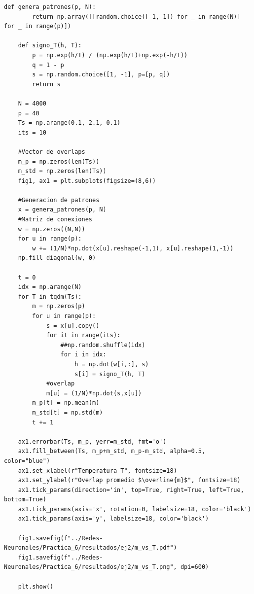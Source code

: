 \documentclass[11pt,twocolumn,twoside]{opticajnl}
\begin{document}
\begin{onecolumn}
\begin{lstlisting}[style=mystyle]
    def genera_patrones(p, N):
        return np.array([[random.choice([-1, 1]) for _ in range(N)] for _ in range(p)])
    
    def signo_T(h, T):
        p = np.exp(h/T) / (np.exp(h/T)+np.exp(-h/T))
        q = 1 - p
        s = np.random.choice([1, -1], p=[p, q])
        return s
    
    N = 4000
    p = 40
    Ts = np.arange(0.1, 2.1, 0.1)
    its = 10
    
    #Vector de overlaps
    m_p = np.zeros(len(Ts))
    m_std = np.zeros(len(Ts))
    fig1, ax1 = plt.subplots(figsize=(8,6))
    
    #Generacion de patrones
    x = genera_patrones(p, N)
    #Matriz de conexiones
    w = np.zeros((N,N))
    for u in range(p):
        w += (1/N)*np.dot(x[u].reshape(-1,1), x[u].reshape(1,-1))
    np.fill_diagonal(w, 0)
    
    t = 0
    idx = np.arange(N)
    for T in tqdm(Ts):
        m = np.zeros(p)
        for u in range(p):
            s = x[u].copy()
            for it in range(its):
                ##np.random.shuffle(idx)
                for i in idx:
                    h = np.dot(w[i,:], s)
                    s[i] = signo_T(h, T)
            #overlap
            m[u] = (1/N)*np.dot(s,x[u])
        m_p[t] = np.mean(m)
        m_std[t] = np.std(m)
        t += 1
    
    ax1.errorbar(Ts, m_p, yerr=m_std, fmt='o')
    ax1.fill_between(Ts, m_p+m_std, m_p-m_std, alpha=0.5, color="blue")
    ax1.set_xlabel(r"Temperatura T", fontsize=18)
    ax1.set_ylabel(r"Overlap promedio $\overline{m}$", fontsize=18)
    ax1.tick_params(direction='in', top=True, right=True, left=True, bottom=True)
    ax1.tick_params(axis='x', rotation=0, labelsize=18, color='black')
    ax1.tick_params(axis='y', labelsize=18, color='black')
    
    fig1.savefig(f"../Redes-Neuronales/Practica_6/resultados/ej2/m_vs_T.pdf")
    fig1.savefig(f"../Redes-Neuronales/Practica_6/resultados/ej2/m_vs_T.png", dpi=600)
    
    plt.show()
\end{lstlisting}
\end{onecolumn}
\end{document}
